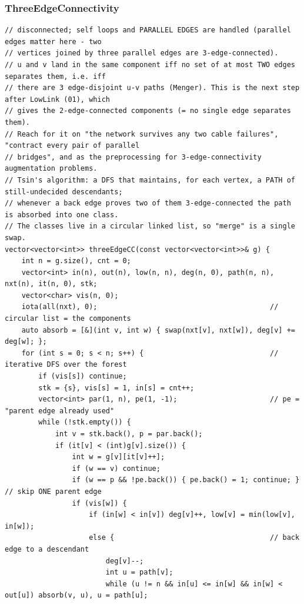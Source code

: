 \documentclass[9pt,a4paper,twocolumn]{extarticle}
\begin{document}
\subsubsection{ThreeEdgeConnectivity}
\nopagebreak
\begin{lstlisting}
// disconnected; self loops and PARALLEL EDGES are handled (parallel edges matter here - two
// vertices joined by three parallel edges are 3-edge-connected).
// u and v land in the same component iff no set of at most TWO edges separates them, i.e. iff
// there are 3 edge-disjoint u-v paths (Menger). This is the next step after LowLink (01), which
// gives the 2-edge-connected components (= no single edge separates them).
// Reach for it on "the network survives any two cable failures", "contract every pair of parallel
// bridges", and as the preprocessing for 3-edge-connectivity augmentation problems.
// Tsin's algorithm: a DFS that maintains, for each vertex, a PATH of still-undecided descendants;
// whenever a back edge proves two of them 3-edge-connected the path is absorbed into one class.
// The classes live in a circular linked list, so "merge" is a single swap.
vector<vector<int>> threeEdgeCC(const vector<vector<int>>& g) {
    int n = g.size(), cnt = 0;
    vector<int> in(n), out(n), low(n, n), deg(n, 0), path(n, n), nxt(n), it(n, 0), stk;
    vector<char> vis(n, 0);
    iota(all(nxt), 0);                                         // circular list = the components
    auto absorb = [&](int v, int w) { swap(nxt[v], nxt[w]), deg[v] += deg[w]; };
    for (int s = 0; s < n; s++) {                              // iterative DFS over the forest
        if (vis[s]) continue;
        stk = {s}, vis[s] = 1, in[s] = cnt++;
        vector<int> par(1, n), pe(1, -1);                      // pe = "parent edge already used"
        while (!stk.empty()) {
            int v = stk.back(), p = par.back();
            if (it[v] < (int)g[v].size()) {
                int w = g[v][it[v]++];
                if (w == v) continue;
                if (w == p && !pe.back()) { pe.back() = 1; continue; }   // skip ONE parent edge
                if (vis[w]) {
                    if (in[w] < in[v]) deg[v]++, low[v] = min(low[v], in[w]);
                    else {                                     // back edge to a descendant
                        deg[v]--;
                        int u = path[v];
                        while (u != n && in[u] <= in[w] && in[w] < out[u]) absorb(v, u), u = path[u];

\end{lstlisting}
\end{document}
